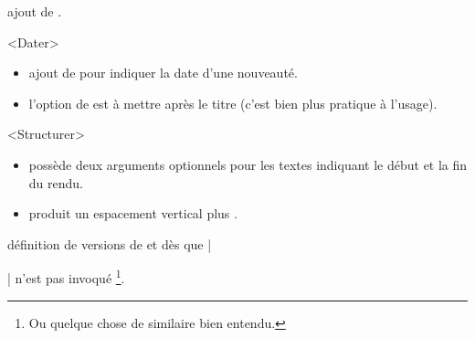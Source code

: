 \begin{bdoctopic}
    ajout de .
\end{bdoctopic}




\begin{bdoctopic}<Dater>
    \begin{itemize}
        \item ajout de  pour indiquer la date d'une nouveauté.

        \item l'option de  est à mettre après le titre (c'est bien plus pratique à l'usage).
    \end{itemize}
\end{bdoctopic}




\begin{bdoctopic}<Structurer>
    \begin{itemize}
        \item {} possède deux arguments optionnels pour les textes indiquant le début et la fin du rendu.

        \item {} produit un espacement vertical plus .
    \end{itemize}
\end{bdoctopic}




\begin{bdoctopic}
    définition de versions  de  et  dès que \bdocinlatex|\usepackage[french]{babel}| n'est pas invoqué
    \footnote{
        Ou quelque chose de similaire bien entendu.
    }.
\end{bdoctopic}
